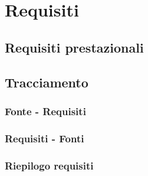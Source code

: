 \section{Requisiti}


\newpage


\newpage

%

%

\subsection{Requisiti prestazionali}




\subsection{Tracciamento}
\subsubsection{Fonte - Requisiti}
\subsubsection{Requisiti - Fonti}
\subsubsection{Riepilogo requisiti}
